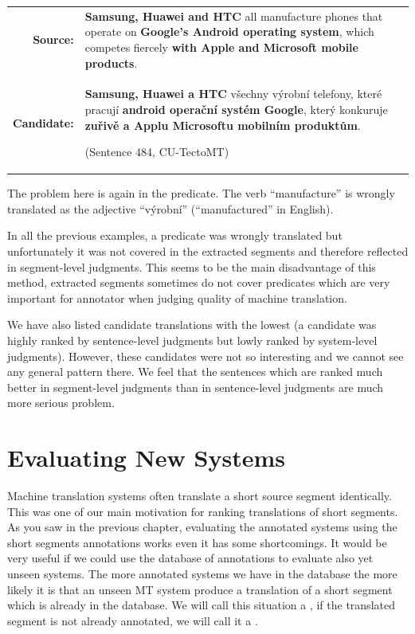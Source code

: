 \begin{center}
  \begin{tabular}{rp{11cm}}

    \textbf{Source:} & \textbf{Samsung, Huawei and HTC} all manufacture phones
    that operate on \textbf{Google's Android operating system}, which competes
    fiercely \textbf{with Apple and Microsoft mobile products}. \\

    \textbf{Candidate:} & \textbf{Samsung, Huawei a HTC} všechny výrobní
    telefony, které pracují \textbf{android operační systém Google}, který
    konkuruje \textbf{zuřivě a Applu Microsoftu mobilním produktům}.
    
    (Sentence 484, CU-TectoMT) \\

  \end{tabular}
\end{center}

The problem here is again in the predicate. The verb ``manufacture'' is wrongly
translated as the adjective ``výrobní'' (``manufactured'' in English).

In all the previous examples, a predicate was wrongly translated but
unfortunately it was not covered in the extracted segments and therefore
reflected in segment-level judgments. This seems to be the main disadvantage of
this method, extracted segments sometimes do not cover predicates which are
very important for annotator when judging quality of machine translation.

We have also listed candidate translations with the lowest  (a candidate was highly ranked by sentence-level judgments but lowly
ranked by system-level judgments). However, these candidates were not so
interesting and we cannot see any general pattern there. We feel that the
sentences which are ranked much better in segment-level judgments than in
sentence-level judgments are much more serious problem.

\section{Evaluating New Systems}
\label{evaluating-new-systems}

Machine translation systems often translate a short source segment identically.
This was one of our main motivation for ranking translations of short segments.
As you saw in the previous chapter, evaluating the annotated systems using the
short segments annotations works even it has some shortcomings.  It would be
very useful if we could use the database of annotations to evaluate also yet
unseen systems. The more annotated systems we have in the database the more
likely it is that an unseen MT system produce a translation of a short segment
which is already in the database. We will call this situation a ,
if the translated segment is not already annotated, we will call it a
.

